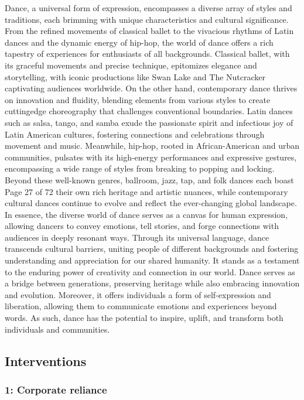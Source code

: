 \documentclass[
  letterpaper,
  DIV=11,
  numbers=noendperiod]{scrartcl}
\begin{document}
Dance, a universal form of expression, encompasses a diverse array of
styles and traditions, each brimming with unique characteristics and
cultural significance. From the refined movements of classical ballet to
the vivacious rhythms of Latin dances and the dynamic energy of hip-hop,
the world of dance offers a rich tapestry of experiences for enthusiasts
of all backgrounds. Classical ballet, with its graceful movements and
precise technique, epitomizes elegance and storytelling, with iconic
productions like Swan Lake and The Nutcracker captivating audiences
worldwide. On the other hand, contemporary dance thrives on innovation
and fluidity, blending elements from various styles to create
cuttingedge choreography that challenges conventional boundaries. Latin
dances such as salsa, tango, and samba exude the passionate spirit and
infectious joy of Latin American cultures, fostering connections and
celebrations through movement and music. Meanwhile, hip-hop, rooted in
African-American and urban communities, pulsates with its high-energy
performances and expressive gestures, encompassing a wide range of
styles from breaking to popping and locking. Beyond these well-known
genres, ballroom, jazz, tap, and folk dances each boast Page 27 of 72
their own rich heritage and artistic nuances, while contemporary
cultural dances continue to evolve and reflect the ever-changing global
landscape. In essence, the diverse world of dance serves as a canvas for
human expression, allowing dancers to convey emotions, tell stories, and
forge connections with audiences in deeply resonant ways. Through its
universal language, dance transcends cultural barriers, uniting people
of different backgrounds and fostering understanding and appreciation
for our shared humanity. It stands as a testament to the enduring power
of creativity and connection in our world. Dance serves as a bridge
between generations, preserving heritage while also embracing innovation
and evolution. Moreover, it offers individuals a form of self-expression
and liberation, allowing them to communicate emotions and experiences
beyond words. As such, dance has the potential to inspire, uplift, and
transform both individuals and communities.

\subsection{Interventions}\label{interventions}

\subsubsection{1: Corporate reliance}\label{corporate-reliance}
\end{document}
